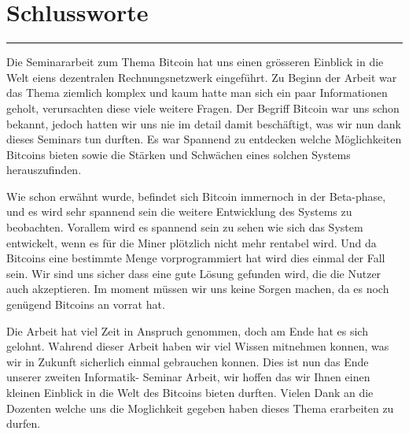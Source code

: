 \documentclass[a4paper, 11pt, DIV11, BCOR5mm]{scrartcl}
\begin{document}
\vspace*{1mm}
\section*{Schlussworte}
\vspace{-10mm}
\noindent\rule{0.8\textwidth}{0.4pt}

Die Seminararbeit zum Thema Bitcoin hat uns einen grösseren Einblick in die Welt eiens dezentralen Rechnungsnetzwerk eingeführt.
Zu Beginn der Arbeit war das Thema ziemlich komplex und kaum hatte man sich ein paar Informationen geholt, verursachten diese
viele weitere Fragen. Der Begriff Bitcoin war uns schon bekannt, jedoch hatten wir uns nie im detail damit beschäftigt, was wir
nun dank dieses Seminars tun durften. Es war Spannend zu entdecken welche Möglichkeiten Bitcoins bieten sowie die Stärken und
Schwächen eines solchen Systems herauszufinden.

\noindent
Wie schon erwähnt wurde, befindet sich Bitcoin immernoch in der Beta-phase, und es wird sehr spannend sein die weitere Entwicklung
des Systems zu beobachten. Vorallem wird es spannend sein zu sehen wie sich das System entwickelt, wenn es für die Miner plötzlich
nicht mehr rentabel wird. Und da Bitcoins eine bestimmte Menge vorprogrammiert hat wird dies einmal der Fall sein.
Wir sind uns sicher dass eine gute Lösung gefunden wird, die die Nutzer auch akzeptieren. Im moment müssen wir uns keine Sorgen machen,
da es noch genügend Bitcoins an vorrat hat.

\noindent
Die Arbeit hat viel Zeit in Anspruch genommen, doch am Ende hat es sich gelohnt.
Wahrend dieser Arbeit haben wir viel Wissen mitnehmen konnen, was wir in Zukunft
sicherlich einmal gebrauchen konnen. Dies ist nun das Ende unserer zweiten Informatik-
Seminar Arbeit, wir hoffen das wir Ihnen einen kleinen Einblick in die Welt des Bitcoins bieten durften.
Vielen Dank an die Dozenten welche uns die Moglichkeit gegeben haben dieses Thema erarbeiten zu durfen.


\nocite{*}
\newpage
{}


\end{document}
